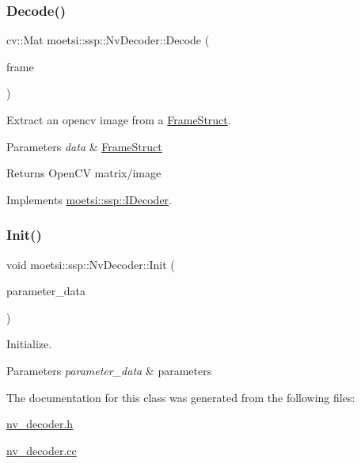 \subsubsection{\texorpdfstring{Decode()}{Decode()}}
{\footnotesize\ttfamily cv\+::\+Mat moetsi\+::ssp\+::\+Nv\+Decoder\+::\+Decode (\begin{DoxyParamCaption}\item[{\hyperlink{structmoetsi_1_1ssp_1_1FrameStruct}{Frame\+Struct} \&}]{frame }\end{DoxyParamCaption})\hspace{0.3cm}{\ttfamily [virtual]}}



Extract an opencv image from a \hyperlink{structmoetsi_1_1ssp_1_1FrameStruct}{Frame\+Struct}. 


\begin{DoxyParams}{Parameters}
{\em data} & \hyperlink{structmoetsi_1_1ssp_1_1FrameStruct}{Frame\+Struct} \\
\hline
\end{DoxyParams}
\begin{DoxyReturn}{Returns}
Open\+CV matrix/image 
\end{DoxyReturn}


Implements \hyperlink{classmoetsi_1_1ssp_1_1IDecoder_a1c06604dc4107d3668a4e791c13cc063}{moetsi\+::ssp\+::\+I\+Decoder}.

\mbox{\label{classmoetsi_1_1ssp_1_1NvDecoder_a004e8a1ed5618df951477c9bb955b6ec}} 
\subsubsection{\texorpdfstring{Init()}{Init()}}
{\footnotesize\ttfamily void moetsi\+::ssp\+::\+Nv\+Decoder\+::\+Init (\begin{DoxyParamCaption}\item[{std\+::vector$<$ unsigned char $>$}]{parameter\+\_\+data }\end{DoxyParamCaption})}



Initialize. 


\begin{DoxyParams}{Parameters}
{\em parameter\+\_\+data} & parameters \\
\hline
\end{DoxyParams}


The documentation for this class was generated from the following files\+:\begin{DoxyCompactItemize}
\item 
\hyperlink{nv__decoder_8h}{nv\+\_\+decoder.\+h}\item 
\hyperlink{nv__decoder_8cc}{nv\+\_\+decoder.\+cc}\end{DoxyCompactItemize}

